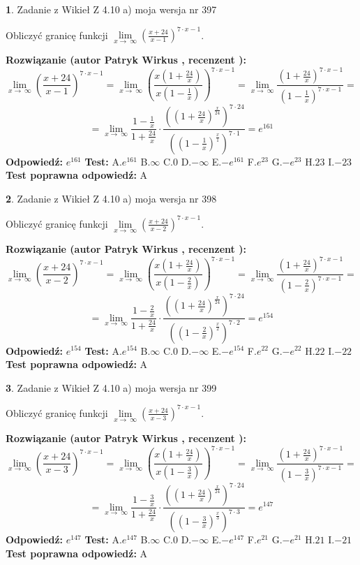 \documentclass[12pt, a4paper]{article}
\theoremstyle{definition} %
\newtheorem{zad}{}
\newcommand{\zadStart}[1]{\begin{zad}#1\newline}
\newcommand{\zadStop}{\end{zad}}
\newcommand{\rozwStart}[2]{\noindent \textbf{Rozwiązanie (autor #1 , recenzent #2): }\newline}
\newcommand{\rozwStop}{\newline}
\newcommand{\odpStart}{\noindent \textbf{Odpowiedź:}\newline}
\newcommand{\odpStop}{\newline}
\newcommand{\testStart}{\noindent \textbf{Test:}\newline}
\newcommand{\testStop}{\newline}
\newcommand{\kluczStart}{\noindent \textbf{Test poprawna odpowiedź:}\newline}
\newcommand{\kluczStop}{\newline}
\begin{document}
\zadStart{Zadanie z Wikieł Z 4.10 a) moja wersja nr 397}

Obliczyć granicę funkcji  $\lim\limits_{x\to\ \infty}(\frac{x+24}{x-1})^{7\cdot x-1}$.
\zadStop
\rozwStart{Patryk Wirkus}{}
$$\lim\limits_{x\to\ \infty}(\frac{x+24}{x-1})^{7\cdot x-1} = \lim\limits_{x\to\ \infty}(\frac{x(1+\frac{24}{x})}{x(1-\frac{1}{x})})^{7\cdot x-1}=\lim\limits_{x\to\ \infty}\frac{(1+\frac{24}{x})^{7\cdot x-1}}{(1-\frac{1}{x})^{7\cdot x-1}}=$$
$$=\lim\limits_{x\to\ \infty}\frac{1-\frac{1}{x}}{1+\frac{24}{x}}\cdot\frac{((1+\frac{24}{x})^{\frac{x}{24}})^{7\cdot24}}{((1-\frac{1}{x})^{\frac{x}{1}})^{7\cdot1}}=e^{161}$$
\rozwStop
\odpStart
$e^{161}$
\odpStop
\testStart
A.$e^{161}$ B.$\infty$ C.$0$ D.$-\infty$ E.$-e^{161}$
F.$e^{23}$ G.$-e^{23}$
H.$23$
I.$-23$
\testStop
\kluczStart
A
\kluczStop



\zadStart{Zadanie z Wikieł Z 4.10 a) moja wersja nr 398}

Obliczyć granicę funkcji  $\lim\limits_{x\to\ \infty}(\frac{x+24}{x-2})^{7\cdot x-1}$.
\zadStop
\rozwStart{Patryk Wirkus}{}
$$\lim\limits_{x\to\ \infty}(\frac{x+24}{x-2})^{7\cdot x-1} = \lim\limits_{x\to\ \infty}(\frac{x(1+\frac{24}{x})}{x(1-\frac{2}{x})})^{7\cdot x-1}=\lim\limits_{x\to\ \infty}\frac{(1+\frac{24}{x})^{7\cdot x-1}}{(1-\frac{2}{x})^{7\cdot x-1}}=$$
$$=\lim\limits_{x\to\ \infty}\frac{1-\frac{2}{x}}{1+\frac{24}{x}}\cdot\frac{((1+\frac{24}{x})^{\frac{x}{24}})^{7\cdot24}}{((1-\frac{2}{x})^{\frac{x}{2}})^{7\cdot2}}=e^{154}$$
\rozwStop
\odpStart
$e^{154}$
\odpStop
\testStart
A.$e^{154}$ B.$\infty$ C.$0$ D.$-\infty$ E.$-e^{154}$
F.$e^{22}$ G.$-e^{22}$
H.$22$
I.$-22$
\testStop
\kluczStart
A
\kluczStop



\zadStart{Zadanie z Wikieł Z 4.10 a) moja wersja nr 399}

Obliczyć granicę funkcji  $\lim\limits_{x\to\ \infty}(\frac{x+24}{x-3})^{7\cdot x-1}$.
\zadStop
\rozwStart{Patryk Wirkus}{}
$$\lim\limits_{x\to\ \infty}(\frac{x+24}{x-3})^{7\cdot x-1} = \lim\limits_{x\to\ \infty}(\frac{x(1+\frac{24}{x})}{x(1-\frac{3}{x})})^{7\cdot x-1}=\lim\limits_{x\to\ \infty}\frac{(1+\frac{24}{x})^{7\cdot x-1}}{(1-\frac{3}{x})^{7\cdot x-1}}=$$
$$=\lim\limits_{x\to\ \infty}\frac{1-\frac{3}{x}}{1+\frac{24}{x}}\cdot\frac{((1+\frac{24}{x})^{\frac{x}{24}})^{7\cdot24}}{((1-\frac{3}{x})^{\frac{x}{3}})^{7\cdot3}}=e^{147}$$
\rozwStop
\odpStart
$e^{147}$
\odpStop
\testStart
A.$e^{147}$ B.$\infty$ C.$0$ D.$-\infty$ E.$-e^{147}$
F.$e^{21}$ G.$-e^{21}$
H.$21$
I.$-21$
\testStop
\kluczStart
A
\kluczStop
\end{document}
